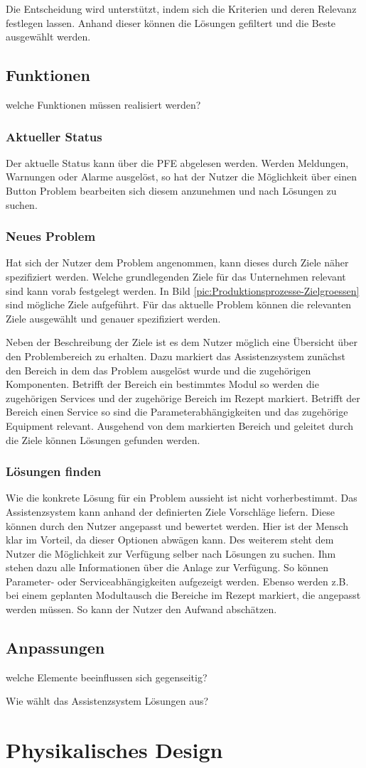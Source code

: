 Die Entscheidung wird unterstützt, indem sich die Kriterien und deren Relevanz festlegen lassen. Anhand dieser können die Lösungen gefiltert und die Beste ausgewählt werden.

\subsection{Funktionen}
welche Funktionen müssen realisiert werden?

\subsubsection*{Aktueller Status}
Der aktuelle Status kann über die PFE abgelesen werden. Werden Meldungen, Warnungen oder Alarme ausgelöst, so hat der Nutzer die Möglichkeit über einen Button Problem bearbeiten sich diesem anzunehmen und nach Lösungen zu suchen.

\subsubsection*{Neues Problem}
Hat sich der Nutzer dem Problem angenommen, kann dieses durch Ziele näher spezifiziert werden. Welche grundlegenden Ziele für das Unternehmen relevant sind kann vorab festgelegt werden. In Bild \ref{pic:Produktionsprozesse-Zielgroessen} sind mögliche Ziele aufgeführt. Für das aktuelle Problem können die relevanten Ziele ausgewählt und genauer spezifiziert werden. 

Neben der Beschreibung der Ziele ist es dem Nutzer möglich eine Übersicht über den Problembereich zu erhalten. Dazu markiert das Assistenzsystem zunächst den Bereich in dem das Problem ausgelöst wurde und die zugehörigen Komponenten. Betrifft der Bereich ein bestimmtes Modul so werden die zugehörigen Services und der zugehörige Bereich im Rezept markiert. Betrifft der Bereich einen Service so sind die Parameterabhängigkeiten und das zugehörige Equipment relevant. Ausgehend von dem markierten Bereich und geleitet durch die Ziele können Lösungen gefunden werden.

\subsubsection*{Lösungen finden}
Wie die konkrete Lösung für ein Problem aussieht ist nicht vorherbestimmt. Das Assistenzsystem kann anhand der definierten Ziele Vorschläge liefern. Diese können durch den Nutzer angepasst und bewertet werden. Hier ist der Mensch klar im Vorteil, da dieser Optionen abwägen kann. Des weiterem steht dem Nutzer die Möglichkeit zur Verfügung selber nach Lösungen zu suchen. Ihm stehen dazu alle Informationen über die Anlage zur Verfügung. So können Parameter- oder Serviceabhängigkeiten aufgezeigt werden. Ebenso werden z.B. bei einem geplanten Modultausch die Bereiche im Rezept markiert, die angepasst werden müssen. So kann der Nutzer den Aufwand abschätzen.

\subsection{Anpassungen}
welche Elemente beeinflussen sich gegenseitig?

Wie wählt das Assistenzsystem Lösungen aus?

\section{Physikalisches Design}